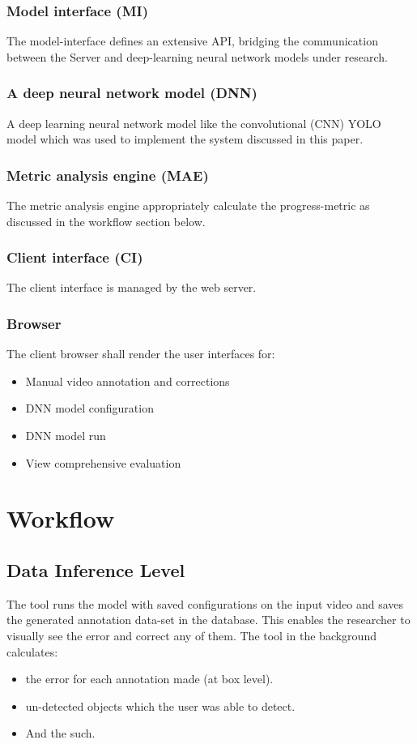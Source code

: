 \documentclass[conference]{IEEEtran}
\begin{document}
\subsubsection{Model interface (MI)}
The model-interface defines an extensive API, bridging the communication between the Server and deep-learning neural network models under research.
\subsubsection{A deep neural network model (DNN)}
A deep learning neural network model like the convolutional (CNN) YOLO model which was used to implement the system discussed in this paper.
\subsubsection{Metric analysis engine (MAE)}
The metric analysis engine appropriately calculate the progress-metric as discussed in the workflow section below.
\subsubsection{Client interface (CI)}
The client interface is managed by the web server.
\subsubsection{Browser}
The client browser shall render the user interfaces for:
\begin{itemize}
	\item Manual video annotation and corrections
	\item DNN model configuration
	\item DNN model run
	\item View comprehensive evaluation
\end{itemize}

\section{Workflow}
\subsection{Data Inference Level}
The tool runs the model with saved configurations on the input video and saves the generated annotation data-set in the database. This enables the researcher to visually see the error and correct any of them. The tool in the background calculates:
\begin{itemize}
	\item the error for each annotation made (at box level).
	\item un-detected objects which the user was able to detect.
	\item And the such.
\end{itemize}
\end{document}
